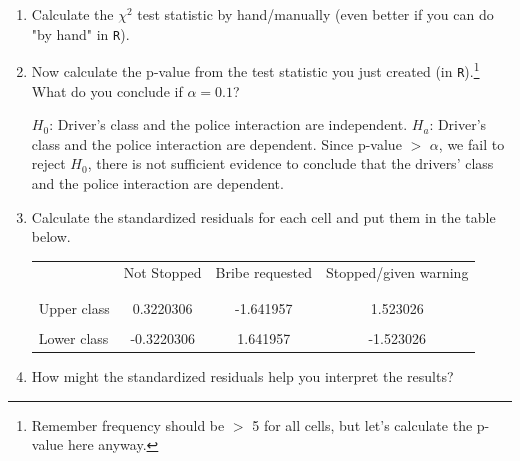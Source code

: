 \documentclass[12pt,letterpaper]{article}
\begin{document}
\begin{enumerate}
	
	\item [(a)]
	Calculate the $\chi^2$ test statistic by hand/manually (even better if you can do "by hand" in \texttt{R}).\\

	\begin{doublespace}
		
	\end{doublespace}
	\newpage
	\item [(b)]
	Now calculate the p-value from the test statistic you just created (in \texttt{R}).\footnote{Remember frequency should be $>$ 5 for all cells, but let's calculate the p-value here anyway.}  What do you conclude if $\alpha = 0.1$?\\
	\begin{doublespace}
		
		$H_0$: Driver's class and the police interaction are independent.
		$H_a$: Driver's class and the police interaction are dependent.
		Since p-value $>$ $\alpha$, we fail to reject $H_0$, there is not sufficient evidence to conclude that the drivers' class and the police interaction are dependent.
		
	\end{doublespace}
	
	\newpage
	\item [(c)] Calculate the standardized residuals for each cell and put them in the table below.
	\vspace{1cm}
	
	\begin{table}[h]
		\centering
		\begin{tabular}{l | c c c }
			& Not Stopped & Bribe requested & Stopped/given warning \\
			\\[-1.8ex] 
			\hline \\[-1.8ex]
			Upper class  & 0.3220306 & -1.641957 & 1.523026 \\
			\\
			Lower class & -0.3220306 & 1.641957  & -1.523026 \\
			\hline
		\end{tabular}
		
	\end{table}
	
	
	\vspace{7cm}
	\item [(d)] How might the standardized residuals help you interpret the results?  
	
\end{enumerate}
\newpage
\end{document}
